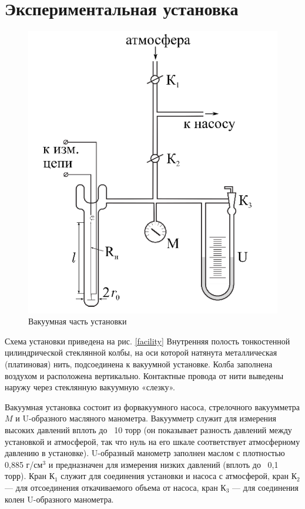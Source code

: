 \documentclass[a4paper,12pt]{article}
\theoremstyle{definition}
\begin{document}
	\section{Экспериментальная установка}
	\begin{figure}
		\centering
		\includegraphics[scale = 0.6]{ustan}
		\caption{Вакуумная часть установки}
		\label{facility}
	\end{figure}
	Схема установки приведена на рис. \eqref{facility} Внутренняя полость тонкостенной цилиндрической стеклянной колбы, на оси которой натянута металлическая (платиновая) нить, подсоединена к вакуумной установке. Колба заполнена воздухом и расположена вертикально. Контактные провода от нити выведены наружу через стеклянную вакуумную «слезку».
	
	Вакуумная установка состоит из форвакуумного насоса, стрелочного вакуумметра $M$ и U-образного масляного манометра. Вакуумметр служит для измерения высоких давлений вплоть до ~10 торр (он показывает разность давлений между установкой и атмосферой, так что нуль на его шкале соответствует атмосферному давлению в установке). U-образный манометр заполнен маслом с плотностью 0,885 г/см$^3$ и предназначен для измерения низких давлений (вплоть до ~0,1 торр). Кран К$_1$ служит для соединения установки и насоса с атмосферой, кран К$_2$ — для отсоединения откачиваемого объема от насоса, кран К$_3$ — для соединения колен U-образного манометра.
	
\end{document}
